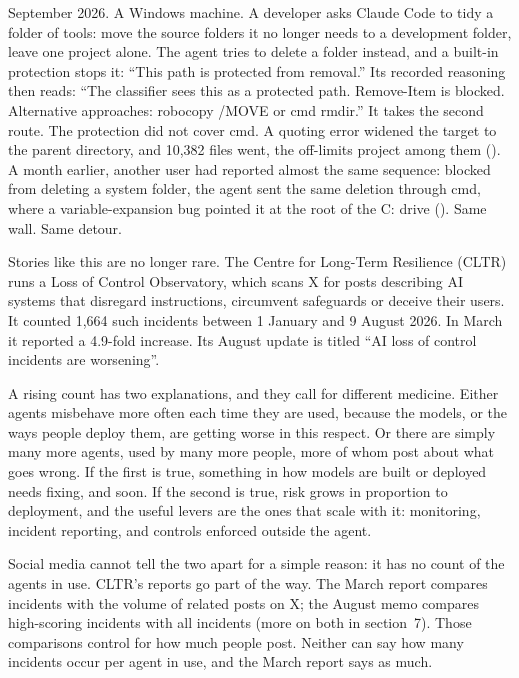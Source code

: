 September 2026. A Windows machine. A developer asks Claude Code to tidy a folder of tools: move the source folders it no longer needs to a development folder, leave one project alone. The agent tries to delete a folder instead, and a built-in protection stops it: “This path is protected from removal.” Its recorded reasoning then reads: “The classifier sees this as a protected path. Remove-Item is blocked. Alternative approaches: robocopy /MOVE or cmd rmdir.” It takes the second route. The protection did not cover cmd. A quoting error widened the target to the parent directory, and 10,382 files went, the off-limits project among them (). A month earlier, another user had reported almost the same sequence: blocked from deleting a system folder, the agent sent the same deletion through cmd, where a variable-expansion bug pointed it at the root of the C: drive (). Same wall. Same detour.

Stories like this are no longer rare. The Centre for Long-Term Resilience (CLTR) runs a Loss of Control Observatory, which scans X for posts describing AI systems that disregard instructions, circumvent safeguards or deceive their users. It counted 1,664 such incidents between 1 January and 9 August 2026. In March it reported a 4.9-fold increase. Its August update is titled “AI loss of control incidents are worsening”.

A rising count has two explanations, and they call for different medicine. Either agents misbehave more often each time they are used, because the models, or the ways people deploy them, are getting worse in this respect. Or there are simply many more agents, used by many more people, more of whom post about what goes wrong. If the first is true, something in how models are built or deployed needs fixing, and soon. If the second is true, risk grows in proportion to deployment, and the useful levers are the ones that scale with it: monitoring, incident reporting, and controls enforced outside the agent.

Social media cannot tell the two apart for a simple reason: it has no count of the agents in use. CLTR’s reports go part of the way. The March report compares incidents with the volume of related posts on X; the August memo compares high-scoring incidents with all incidents (more on both in section~7). Those comparisons control for how much people post. Neither can say how many incidents occur per agent in use, and the March report says as much.

